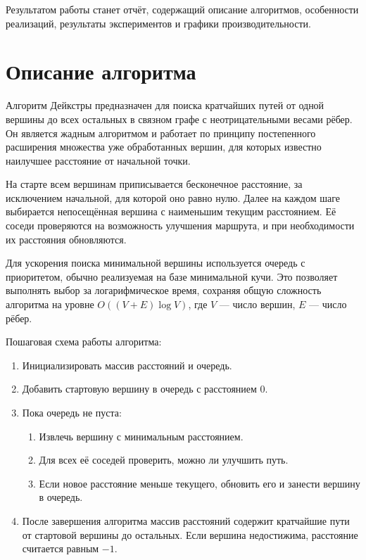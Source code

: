 \documentclass[12pt,a4paper]{extarticle}
\begin{document}
Результатом работы станет отчёт, содержащий описание алгоритмов, особенности реализаций,
результаты экспериментов и графики производительности.

\section{Описание алгоритма}

Алгоритм Дейкстры предназначен для поиска кратчайших путей от одной вершины до всех остальных
в связном графе с неотрицательными весами рёбер. Он является жадным алгоритмом и работает
по принципу постепенного расширения множества уже обработанных вершин, для которых известно
наилучшее расстояние от начальной точки.

На старте всем вершинам приписывается бесконечное расстояние, за исключением начальной,
для которой оно равно нулю. Далее на каждом шаге выбирается непосещённая вершина с наименьшим
текущим расстоянием. Её соседи проверяются на возможность улучшения маршрута, и при
необходимости их расстояния обновляются.

Для ускорения поиска минимальной вершины используется очередь с приоритетом, обычно реализуемая
на базе минимальной кучи. Это позволяет выполнять выбор за логарифмическое время, сохраняя
общую сложность алгоритма на уровне $O((V + E)\log V)$, где $V$ — число вершин, $E$ — число рёбер.

Пошаговая схема работы алгоритма:

\begin{enumerate}
    \item Инициализировать массив расстояний и очередь.
    \item Добавить стартовую вершину в очередь с расстоянием 0.
    \item Пока очередь не пуста:
    \begin{enumerate}
        \item Извлечь вершину с минимальным расстоянием.
        \item Для всех её соседей проверить, можно ли улучшить путь.
        \item Если новое расстояние меньше текущего, обновить его и занести вершину в очередь.
    \end{enumerate}
    \item После завершения алгоритма массив расстояний содержит кратчайшие пути от стартовой
    вершины до остальных. Если вершина недостижима, расстояние считается равным $-1$.
\end{enumerate}
\end{document}
